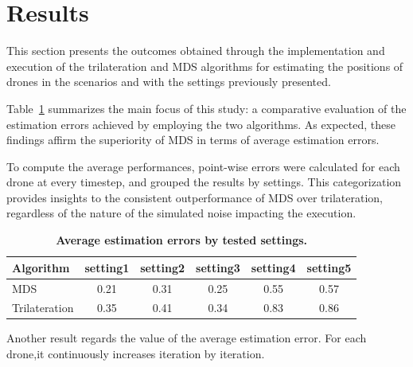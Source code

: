 
\section{Results}\label{sec:results_section}
This section presents the outcomes obtained through the implementation and execution of the trilateration and MDS algorithms for estimating the positions of drones in the scenarios and with the settings previously presented.\par

Table~\ref{tab:comparison} summarizes the main focus of this study: a comparative evaluation of the estimation errors achieved by employing the two algorithms. As expected, these findings affirm the superiority of MDS in terms of average estimation errors. \par

To compute the average performances, point-wise errors were calculated for each drone at every timestep, and grouped the results by settings. This categorization provides insights to the consistent outperformance of MDS over trilateration, regardless of the nature of the simulated noise impacting the execution.

\begin{table}[!ht]
  \centering
    \begin{tabular}{l|ccccc}
      \textbf{Algorithm} & 
      \textbf{setting1} &
      \textbf{setting2} &
      \textbf{setting3} &
      \textbf{setting4} & 
      \textbf{setting5} \\
      \hline
      MDS & 0.21 & 0.31 & 0.25 & 0.55 & 0.57 \\
      Trilateration & 0.35 & 0.41 & 0.34 & 0.83 & 0.86 \\
    \end{tabular}
    \caption[Average estimation errors by tested settings]{
        \textbf{Average estimation errors by tested settings.}
    }
    \label{tab:comparison}
\end{table}


Another result regards the value of the average estimation error. For each drone,it continuously increases iteration by iteration. \par

